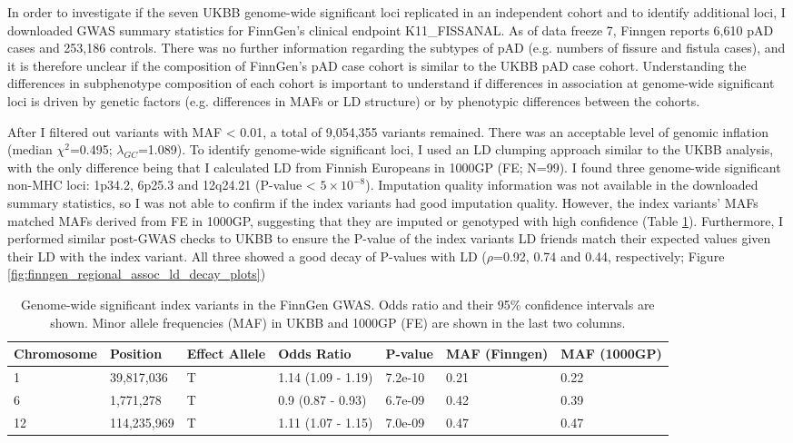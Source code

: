 In order to investigate if the seven UKBB genome-wide significant loci replicated in an independent cohort and to identify additional loci, I downloaded GWAS summary statistics for FinnGen's clinical endpoint K11\_FISSANAL. As of data freeze 7, Finngen reports 6,610 pAD cases and 253,186 controls. There was no further information regarding the subtypes of pAD (e.g. numbers of fissure and fistula cases), and it is therefore unclear if the composition of FinnGen's pAD case cohort is similar to the UKBB pAD case cohort. Understanding the differences in subphenotype composition of each cohort is important to understand if differences in association at genome-wide significant loci is driven by genetic factors (e.g. differences in MAFs or LD structure) or by phenotypic differences between the cohorts. 

After I filtered out variants with MAF < 0.01, a total of 9,054,355 variants remained. There was an acceptable level of genomic inflation (median $\chi^{2}$=0.495; $\lambda_{GC}$=1.089). To identify genome-wide significant loci, I used an LD clumping approach similar to the UKBB analysis, with the only difference being that I calculated LD from Finnish Europeans in 1000GP (FE; N=99). I found three genome-wide significant non-MHC loci: 1p34.2, 6p25.3 and 12q24.21 (P-value < $5\times10^{-8}$). Imputation quality information was not available in the downloaded summary statistics, so I was not able to confirm if the index variants had good imputation quality. However, the index variants' MAFs matched MAFs derived from FE in 1000GP, suggesting that they are imputed or genotyped with high confidence (Table \ref{table:gws_finngen}). Furthermore, I performed similar post-GWAS checks to UKBB to ensure the P-value of the index variants LD friends match their expected values given their LD with the index variant. All three showed a good decay of P-values with LD ($\rho$=0.92, 0.74 and 0.44, respectively; Figure \ref{fig:finngen_regional_assoc_ld_decay_plots})

\begin{table}[htb]
  \centering\begingroup\fontsize{10}{12}\selectfont
  \caption{Genome-wide significant index variants in the FinnGen GWAS. Odds ratio and their 95\% confidence intervals are shown. Minor allele frequencies (MAF) in UKBB and 1000GP (FE) are shown in the last two columns.}
  \label{table:gws_finngen}
  \begin{tabular}[t]{|l|l|l|l|l|l|l|}
  \hline
  Chromosome & Position & Effect Allele & Odds Ratio & P-value & MAF (Finngen) & MAF (1000GP)\\
  \hline
  1 & 39,817,036 & T & 1.14 (1.09 - 1.19) & 7.2e-10 & 0.21 & 0.22\\
  \hline
  6 & 1,771,278 & T & 0.9 (0.87 - 0.93) & 6.7e-09 & 0.42 & 0.39\\
  \hline
  12 & 114,235,969 & T & 1.11 (1.07 - 1.15) & 7.0e-09 & 0.47 & 0.47\\
  \hline
  \end{tabular}
  \endgroup{}
  \end{table}

